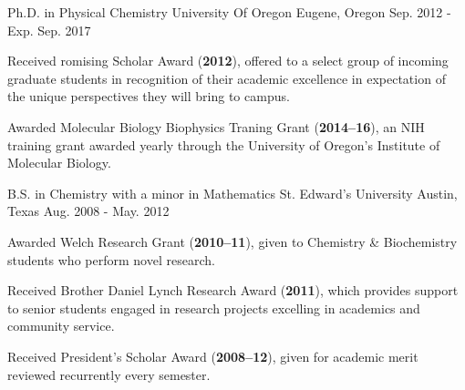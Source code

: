 
%
%

\begin{cventries}
\cventry
  {Ph.D. in Physical Chemistry} %
    {University Of Oregon} %
    {Eugene, Oregon} %
    {Sep. 2012 - Exp. Sep. 2017} %
    {
      \begin{cvitems}
        \item{Received romising Scholar Award (\textbf{2012}), offered to a select group of incoming graduate students in recognition of their academic excellence in expectation of the unique perspectives they will bring to campus.}
        \item{Awarded Molecular Biology Biophysics Traning Grant (\textbf{2014--16}), an NIH training grant awarded yearly through the University of Oregon’s Institute of Molecular Biology. }
      \end{cvitems}
    }
  \cventry
     {B.S. in Chemistry with a minor in Mathematics} %
     {St. Edward's University} %
     {Austin, Texas} %
     {Aug. 2008 - May. 2012} %
     {
       \begin{cvitems} %
         \item{Awarded Welch Research Grant (\textbf{2010--11}), given to Chemistry \& Biochemistry students who perform novel research.}
         \item{Received Brother Daniel Lynch Research Award (\textbf{2011}), which provides support to senior students engaged in research projects excelling in academics and community service.}
         \item{Received President's Scholar Award (\textbf{2008--12}), given for academic merit reviewed recurrently every semester.}
       \end{cvitems}
     }
\end{cventries}
